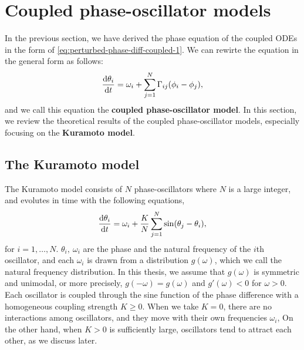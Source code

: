 \section{Coupled phase-oscillator models}
\label{sec:review-cpo}

In the previous section, we have derived the phase equation of the coupled ODEs in the form of \eqref{eq:perturbed-phase-diff-coupled-1}.
We can rewirte the equation in the general form as follows:
\begin{align}
  \frac{\mathrm{d}\theta_{i}}{\mathrm{d} t}=\omega_{i}+\sum_{j=1}^{N}\Gamma_{ij}(\phi_{i}-\phi_{j}),
  \label{eq:coupled-phase-oscillator}
\end{align}
and we call this equation the \textbf{coupled phase-oscillator model}.
In this section, we review the theoretical results of the coupled phase-oscillator models, especially focusing on the \textbf{Kuramoto model}.

\subsection{The Kuramoto model}
The Kuramoto model consists of $N$ phase-oscillators where $N$ is a large integer,
and evolutes in time with the following equations,
\begin{align}
  \frac{\mathrm{d}\theta_{i}}{\mathrm{d} t}=\omega_{i}+\frac{K}{N}\sum_{j=1}^{N}\sin(\theta_{j}-\theta_{i}),
  \label{eq:kuramoto-N}
\end{align}
for $i=1,\dots,N$.
$\theta_{i},~\omega_{i}$ are the phase and the natural frequency 
of the $i$th oscillator,
and each $\omega_{i}$ is drawn from a distribution $g(\omega)$,
which we call the natural frequency distribution.
In this thesis, we assume that $g(\omega)$ is symmetric and unimodal,
or more precisely,
$g(-\omega)=g(\omega)$ and $g'(\omega)<0$ for $\omega>0$.
Each oscillator is coupled through the sine function of the phase difference
with a homogeneous coupling strength $K\geq 0$.
When we take $K=0$,
there are no interactions among oscillators,
and they move with their own frequencies $\omega_{i}$,
On the other hand, when $K>0$ is sufficiently large,
oscillators tend to attract each other,
as we discuss later.

